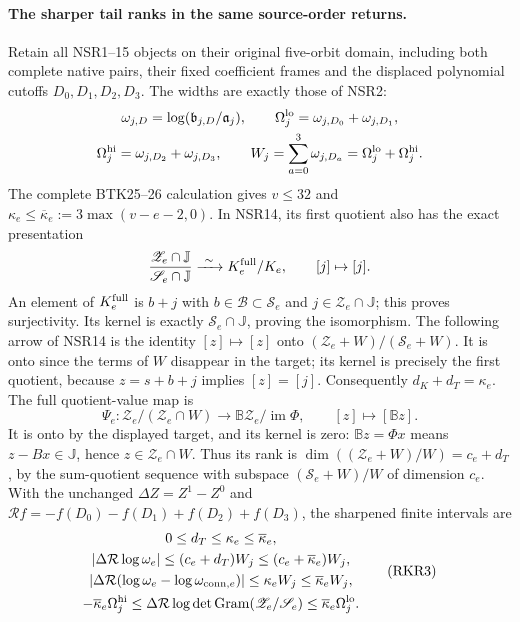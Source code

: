 \documentclass[11pt,a4paper]{article}
\begin{document}
\paragraph{The sharper tail ranks in the same source-order returns.}
Retain all NSR1--15 objects on their original five-orbit domain,
including both complete native pairs, their fixed coefficient
frames and the displaced polynomial cutoffs $D_0,D_1,D_2,D_3$.
The widths are exactly those of NSR2:
\[
\begin{gathered}
\omega_{j,D}=\log(\mathfrak b_{j,D}/\mathfrak a_j),\qquad
\Omega_j^{\rm lo}=\omega_{j,D_0}+\omega_{j,D_1},\\
\Omega_j^{\rm hi}=\omega_{j,D_2}+\omega_{j,D_3},\qquad
W_j=\sum_{a=0}^3\omega_{j,D_a}
   =\Omega_j^{\rm lo}+\Omega_j^{\rm hi}.
\end{gathered}
\]
The complete BTK25--26 calculation gives
$v\le32$ and $\kappa_e\le\overline\kappa_e:=3\max(v-e-2,0)$.
In NSR14, its first quotient also has the exact presentation
\[
\frac{\mathscr Z_e\cap\mathbb J}{\mathscr S_e\cap\mathbb J}
 \xrightarrow{\ \sim\ }K_e^{\rm full}/K_e,
 \qquad[j]\mapsto[j].
\]
An element of $K_e^{\rm full}$ is $b+j$ with
$b\in\mathscr B\subset\mathscr S_e$ and
$j\in\mathscr Z_e\cap\mathbb J$; this proves surjectivity.
Its kernel is exactly $\mathscr S_e\cap\mathbb J$,
proving the isomorphism. The following arrow of NSR14 is
the identity $[z]\mapsto[z]$ onto
$(\mathscr Z_e+W)/(\mathscr S_e+W)$.
It is onto since the terms of $W$ disappear in the target;
its kernel is precisely the first quotient, because
$z=s+b+j$ implies $[z]=[j]$.
Consequently $d_K+d_T=\kappa_e$. The full quotient-value map is
\[
\Psi_e:\mathscr Z_e/(\mathscr Z_e\cap W)
 \longrightarrow\mathbb B\mathscr Z_e/\operatorname{im}\Phi,
 \qquad[z]\longmapsto[\mathbb Bz].
\]
It is onto by the displayed target, and its kernel is zero:
$\mathbb Bz=\Phi x$ means $z-Bx\in\mathbb J$, hence
$z\in\mathscr Z_e\cap W$. Thus its rank is
$\dim((\mathscr Z_e+W)/W)=c_e+d_T$, by the sum-quotient
sequence with subspace $(\mathscr S_e+W)/W$ of dimension $c_e$.
With the unchanged $\Delta Z=Z^1-Z^0$ and
$\mathcal Rf=-f(D_0)-f(D_1)+f(D_2)+f(D_3)$, the sharpened
finite intervals are
\[
\begin{gathered}
0\le d_T\le\kappa_e\le\overline\kappa_e,\\
\left|\Delta\mathcal R\log\omega_e\right|
 \le(c_e+d_T)W_j\le(c_e+\overline\kappa_e)W_j,\\
\left|\Delta\mathcal R
 (\log\omega_e-\log\omega_{{\rm conn},e})\right|
 \le\kappa_e W_j\le\overline\kappa_e W_j,\\
-\overline\kappa_e\Omega_j^{\rm hi}
 \le\Delta\mathcal R\log\det\operatorname{Gram}
             (\mathscr Z_e/\mathscr S_e)
 \le\overline\kappa_e\Omega_j^{\rm lo}.
\end{gathered}\tag{RKR3}
\]
\end{document}
